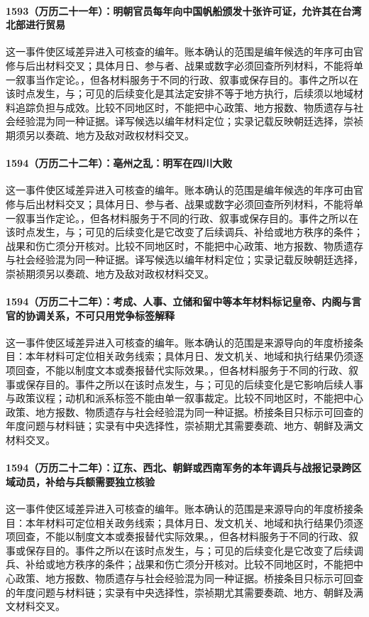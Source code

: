 \paragraph{1593（万历二十一年）：明朝官员每年向中国帆船颁发十张许可证，允许其在台湾北部进行贸易} 这一事件使区域差异进入可核查的编年。账本确认的范围是编年候选的年序可由官修与后出材料交叉；具体月日、参与者、战果或数字必须回查所列材料，不能将单一叙事当作定论。，但各材料服务于不同的行政、叙事或保存目的。事件之所以在该时点发生，与；可见的后续变化是其法定安排不等于地方执行，后续须以地域材料追踪负担与成效。比较不同地区时，不能把中心政策、地方报数、物质遗存与社会经验混为同一种证据。译写候选以编年材料定位；实录记载反映朝廷选择，崇祯期须另以奏疏、地方及敌对政权材料交叉。

\paragraph{1594（万历二十二年）：亳州之乱：明军在四川大败} 这一事件使区域差异进入可核查的编年。账本确认的范围是编年候选的年序可由官修与后出材料交叉；具体月日、参与者、战果或数字必须回查所列材料，不能将单一叙事当作定论。，但各材料服务于不同的行政、叙事或保存目的。事件之所以在该时点发生，与；可见的后续变化是它改变了后续调兵、补给或地方秩序的条件；战果和伤亡须分开核对。比较不同地区时，不能把中心政策、地方报数、物质遗存与社会经验混为同一种证据。译写候选以编年材料定位；实录记载反映朝廷选择，崇祯期须另以奏疏、地方及敌对政权材料交叉。

\paragraph{1594（万历二十二年）：考成、人事、立储和留中等本年材料标记皇帝、内阁与言官的协调关系，不可只用党争标签解释} 这一事件使区域差异进入可核查的编年。账本确认的范围是来源导向的年度桥接条目：本年材料可定位相关政务线索；具体月日、发文机关、地域和执行结果仍须逐项回查，不能以制度文本或奏报替代实际效果。，但各材料服务于不同的行政、叙事或保存目的。事件之所以在该时点发生，与；可见的后续变化是它影响后续人事与政策议程；动机和派系标签不能由单一叙事裁定。比较不同地区时，不能把中心政策、地方报数、物质遗存与社会经验混为同一种证据。桥接条目只标示可回查的年度问题与材料链；实录有中央选择性，崇祯期尤其需要奏疏、地方、朝鲜及满文材料交叉。

\paragraph{1594（万历二十二年）：辽东、西北、朝鲜或西南军务的本年调兵与战报记录跨区域动员，补给与兵额需要独立核验} 这一事件使区域差异进入可核查的编年。账本确认的范围是来源导向的年度桥接条目：本年材料可定位相关政务线索；具体月日、发文机关、地域和执行结果仍须逐项回查，不能以制度文本或奏报替代实际效果。，但各材料服务于不同的行政、叙事或保存目的。事件之所以在该时点发生，与；可见的后续变化是它改变了后续调兵、补给或地方秩序的条件；战果和伤亡须分开核对。比较不同地区时，不能把中心政策、地方报数、物质遗存与社会经验混为同一种证据。桥接条目只标示可回查的年度问题与材料链；实录有中央选择性，崇祯期尤其需要奏疏、地方、朝鲜及满文材料交叉。
